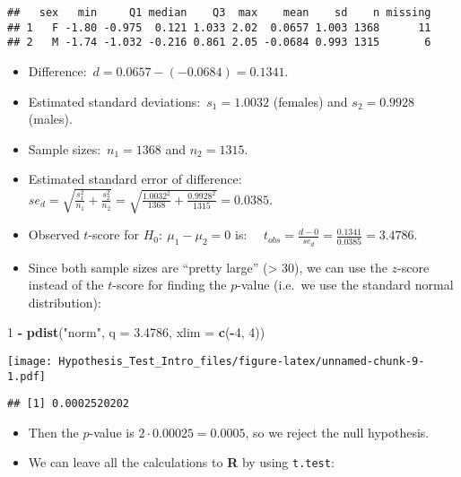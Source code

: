 \documentclass[]{article}
\newenvironment{Shaded}{\begin{snugshade}}{\end{snugshade}}
\newcommand{\KeywordTok}[1]{\textcolor[rgb]{0.13,0.29,0.53}{\textbf{#1}}}
\newcommand{\DataTypeTok}[1]{\textcolor[rgb]{0.13,0.29,0.53}{#1}}
\newcommand{\DecValTok}[1]{\textcolor[rgb]{0.00,0.00,0.81}{#1}}
\newcommand{\FloatTok}[1]{\textcolor[rgb]{0.00,0.00,0.81}{#1}}
\newcommand{\StringTok}[1]{\textcolor[rgb]{0.31,0.60,0.02}{#1}}
\newcommand{\OperatorTok}[1]{\textcolor[rgb]{0.81,0.36,0.00}{\textbf{#1}}}
\newcommand{\NormalTok}[1]{#1}
\providecommand{\tightlist}{%
  \setlength{\itemsep}{0pt}\setlength{\parskip}{0pt}}
\begin{document}
\begin{verbatim}
##   sex   min     Q1 median    Q3  max    mean    sd    n missing
## 1   F -1.80 -0.975  0.121 1.033 2.02  0.0657 1.003 1368      11
## 2   M -1.74 -1.032 -0.216 0.861 2.05 -0.0684 0.993 1315       6
\end{verbatim}

\begin{itemize}
\tightlist
\item
  Difference:~\(d = 0.0657 - (-0.0684) = 0.1341\).
\item
  Estimated standard deviations:~\(s_1 = 1.0032\) (females) and
  \(s_2 = 0.9928\) (males).
\item
  Sample sizes:~\(n_1 = 1368\) and \(n_2 = 1315\).
\item
  Estimated standard error of difference:~
  \(se_d = \sqrt{\frac{s_1^2}{n_1} + \frac{s_2^2}{n_2}} =  \sqrt{\frac{1.0032^2}{1368} + \frac{0.9928^2}{1315}} = 0.0385\).
\item
  Observed \(t\)-score for \(H_0:\ \mu_1-\mu_2=0\) is:
  \(\quad t_{obs} = \frac{d-0}{se_d} = \frac{0.1341}{0.0385} = 3.4786\).
\item
  Since both sample sizes are ``pretty large'' (\textgreater{} 30), we
  can use the \(z\)-score instead of the \(t\)-score for finding the
  \(p\)-value (i.e.~we use the standard normal distribution):
\end{itemize}

\begin{Shaded}
\begin{Highlighting}[]
\DecValTok{1} \OperatorTok{-}\StringTok{ }\KeywordTok{pdist}\NormalTok{(}\StringTok{"norm"}\NormalTok{, }\DataTypeTok{q =} \FloatTok{3.4786}\NormalTok{, }\DataTypeTok{xlim =} \KeywordTok{c}\NormalTok{(}\OperatorTok{-}\DecValTok{4}\NormalTok{, }\DecValTok{4}\NormalTok{))}
\end{Highlighting}
\end{Shaded}

\texttt{[image: Hypothesis\_Test\_Intro\_files/figure-latex/unnamed-chunk-9-1.pdf]}

\begin{verbatim}
## [1] 0.0002520202
\end{verbatim}

\begin{itemize}
\tightlist
\item
  Then the \(p\)-value is \(2\cdot 0.00025 = 0.0005\), so we reject the
  null hypothesis.
\item
  We can leave all the calculations to \textbf{R} by using
  \texttt{t.test}:
\end{itemize}
\end{document}
